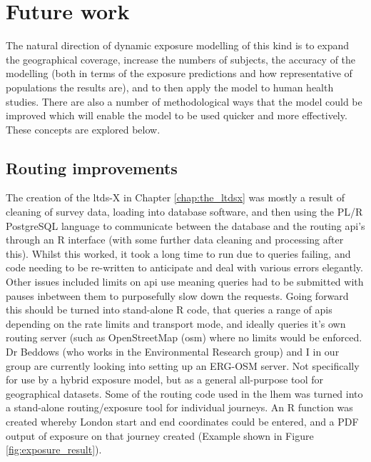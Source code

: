 \newpage
\section{Future work}
\label{sec:future_work}

The natural direction of dynamic exposure modelling of this kind is to expand the geographical coverage, increase the numbers of subjects, the accuracy of the modelling (both in terms of the exposure predictions and how representative of populations the results are), and to then apply the model to human health studies. There are also a number of methodological ways that the model could be improved which will enable the model to be used quicker and more effectively. These concepts are explored below.

\subsection{Routing improvements}
\label{subsec:routing_improvements}

The creation of the \gls{ltds}-X in Chapter \ref{chap:the_ltdsx} was mostly a result of cleaning of survey data, loading into database software, and then using the PL/R PostgreSQL language to communicate between the database and the routing \gls{api}'s through an R interface (with some further data cleaning and processing after this). Whilst this worked, it took a long time to run due to queries failing, and code needing to be re-written to anticipate and deal with various errors elegantly. Other issues included limits on \gls{api} use meaning queries had to be submitted with pauses inbetween them to purposefully slow down the requests. Going forward this should be turned into stand-alone R code, that queries a range of \gls{api}s depending on the rate limits and transport mode, and ideally queries it's own routing server (such as OpenStreetMap (\gls{osm}) where no limits would be enforced. Dr Beddows (who works in the Environmental Research group) and I in our group are currently looking into setting up an ERG-OSM server. Not specifically for use by a hybrid exposure model, but as a general all-purpose tool for geographical datasets. Some of the routing code used in the \gls{lhem} was turned into a stand-alone routing/exposure tool for individual journeys. An R function was created whereby London start and end coordinates could be entered, and a PDF output of exposure on that journey created (Example shown in Figure \ref{fig:exposure_result}).

